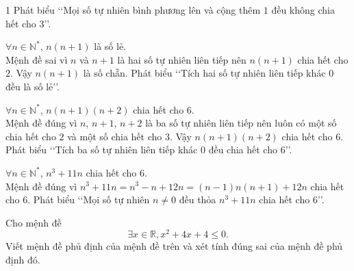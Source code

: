\begin{bt}
{\begin{enumEX}{1}
			Phát biểu \lq\lq Mọi số tự nhiên bình phương lên và cộng  thêm $1$ đều không chia hết cho $3$\rq\rq.
			\item  $\forall n\in \mathbb{N^*}$, $n(n+1)$ là số lẻ.\\
			Mệnh đề sai vì $n$ và $n+1$ là hai số tự nhiên liên tiếp nên $n(n+1)$ chia hết cho $2$. Vậy $n(n+1)$ là số chẵn. Phát  biểu \lq\lq Tích hai số tự nhiên liên tiếp khác $0$ đều là số lẻ\rq\rq.
			\item $\forall  n\in \mathbb{N^*}$, $n(n+1)(n+2)$ chia hết cho $6$.\\
			Mệnh đề đúng vì $n$, $n+1$, $n+2$ là ba số tự nhiên liên  tiếp nên luôn có một số chia hết cho $2$ và một số chia hết cho $3$. Vậy $n(n+1)(n+2)$ chia hết cho $6$. Phát biểu \lq\lq Tích ba số tự nhiên liên tiếp khác $0$ đều chia hết cho $6$\rq\rq.
			\item  $\forall n\in \mathbb{N^*}$, $n^3+11n$ chia hết cho $6$.\\
			Mệnh đề đúng  vì $n^3+11n=n^3-n+12n=(n-1)n(n+1)+12n$ chia hết cho $6$. Phát biểu \lq\lq Mọi số tự nhiên $n\ne 0$ đều thỏa $n^3+11n$ chia hết cho $6$\rq\rq.
		\end{enumEX}
	 }
\end{bt}

\begin{bt}[0,5 điểm]%
	Cho mệnh đề
	$$ \exists x \in \mathbb{R}, x^2 + 4x + 4 \leq 0. $$
	Viết mệnh đề phủ định của mệnh đề trên và xét tính đúng sai của mệnh đề phủ định đó.
\end{bt}

